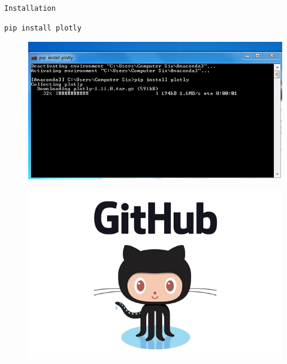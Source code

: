 \documentclass{beamer}
\begin{document}
\begin{frame}[fragile]
	\large
\texttt{Installation}
\begin{framed}
\begin{verbatim}
pip install plotly
\end{verbatim}
\end{framed}
	\begin{figure}
\centering
\includegraphics[width=0.95\linewidth]{pipinstallplotly}

\end{figure}
\end{frame}
\begin{frame}
\begin{figure}
\centering
\includegraphics[width=0.9\linewidth]{github-logo}

\end{figure}
	
\end{frame}
\end{document}
